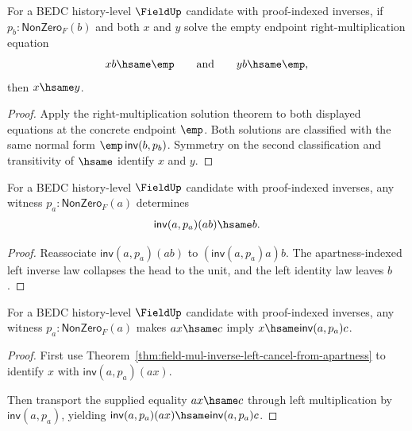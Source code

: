 \begin{theorem}
\label{thm:field-right-mul-empty-equation-solution-unique-from-apartness}
For a BEDC history-level $\FieldUp$ candidate with proof-indexed inverses, if
$p_b:\mathsf{NonZero}_F(b)$ and both $x$ and $y$ solve the empty endpoint
right-multiplication equation
$$
x b\hsame \emp
\qquad\text{and}\qquad
y b\hsame \emp,
$$
then $x\hsame y$.
\end{theorem}
\begin{proof}
Apply the right-multiplication solution theorem to both displayed equations at
the concrete endpoint $\emp$. Both solutions are classified with the same
normal form $\emp\,\mathsf{inv}(b,p_b)$. Symmetry on the second classification
and transitivity of $\hsame$ identify $x$ and $y$.
\end{proof}

\begin{theorem}
\label{thm:field-mul-inverse-left-cancel-from-apartness}
For a BEDC history-level $\FieldUp$ candidate with proof-indexed inverses,
any witness $p_a:\mathsf{NonZero}_F(a)$ determines
$$
\mathsf{inv}(a,p_a)(a b)\hsame b.
$$
\end{theorem}
\begin{proof}
Reassociate $\mathsf{inv}(a,p_a)(a b)$ to
$(\mathsf{inv}(a,p_a)a)b$. The apartness-indexed left inverse law collapses
the head to the unit, and the left identity law leaves $b$.
\end{proof}

\begin{theorem}
\label{thm:field-left-mul-equation-solution-from-apartness}
For a BEDC history-level $\FieldUp$ candidate with proof-indexed inverses,
any witness $p_a:\mathsf{NonZero}_F(a)$ makes $a x\hsame c$ imply
$x\hsame \mathsf{inv}(a,p_a)c$.
\end{theorem}
\begin{proof}
First use Theorem~\ref{thm:field-mul-inverse-left-cancel-from-apartness}
to identify $x$ with $\mathsf{inv}(a,p_a)(a x)$.

Then transport the supplied equality $a x\hsame c$ through left multiplication
by $\mathsf{inv}(a,p_a)$, yielding
$\mathsf{inv}(a,p_a)(a x)\hsame \mathsf{inv}(a,p_a)c$.
\end{proof}

